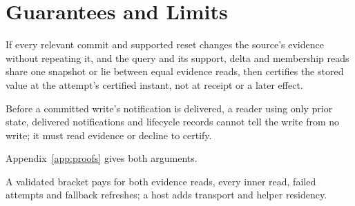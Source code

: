 \section{Guarantees and Limits}
\label{sec:theory}
\begin{proposition}\label{thm:sound}
If every relevant commit and supported reset changes the source's evidence without repeating it, and the query and its support, delta and membership reads share one snapshot or lie between equal evidence reads, then \Fresh certifies the stored value at the attempt's certified instant, not at receipt or a later effect.
\end{proposition}

\begin{observation}\label{thm:indist}
Before a committed write's notification is delivered, a reader using only prior state, delivered notifications and lifecycle records cannot tell the write from no write; it must read evidence or decline to certify.
\end{observation}
Appendix~\ref{app:proofs} gives both arguments.

\begin{proposition}\label{prop:cost}
A validated bracket pays for both evidence reads, every inner read, failed attempts and fallback refreshes; a host adds transport and helper residency.
\end{proposition}
